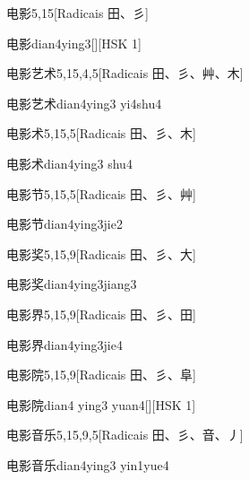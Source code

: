 \begin{entry}{电影}{5,15}[Radicais ⽥、⼺]
  \begin{phonetics}{电影}{dian4ying3}[][HSK 1]
  \end{phonetics}
\end{entry}

\begin{entry}{电影艺术}{5,15,4,5}[Radicais ⽥、⼺、⾋、⽊]
  \begin{phonetics}{电影艺术}{dian4ying3 yi4shu4}
  \end{phonetics}
\end{entry}

\begin{entry}{电影术}{5,15,5}[Radicais ⽥、⼺、⽊]
  \begin{phonetics}{电影术}{dian4ying3 shu4}
  \end{phonetics}
\end{entry}

\begin{entry}{电影节}{5,15,5}[Radicais ⽥、⼺、⾋]
  \begin{phonetics}{电影节}{dian4ying3jie2}
  \end{phonetics}
\end{entry}

\begin{entry}{电影奖}{5,15,9}[Radicais ⽥、⼺、⼤]
  \begin{phonetics}{电影奖}{dian4ying3jiang3}
  \end{phonetics}
\end{entry}

\begin{entry}{电影界}{5,15,9}[Radicais ⽥、⼺、⽥]
  \begin{phonetics}{电影界}{dian4ying3jie4}
  \end{phonetics}
\end{entry}

\begin{entry}{电影院}{5,15,9}[Radicais ⽥、⼺、⾩]
  \begin{phonetics}{电影院}{dian4 ying3 yuan4}[][HSK 1]
  \end{phonetics}
\end{entry}

\begin{entry}{电影音乐}{5,15,9,5}[Radicais ⽥、⼺、⾳、⼃]
  \begin{phonetics}{电影音乐}{dian4ying3 yin1yue4}
  \end{phonetics}
\end{entry}

